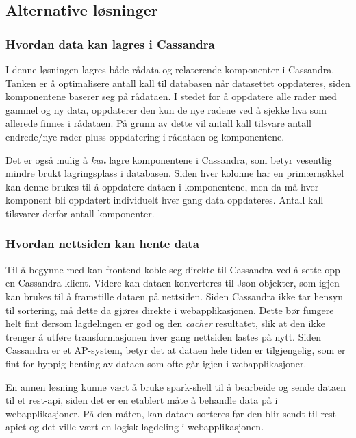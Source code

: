 \subsection{Alternative løsninger}

\subsubsection{Hvordan data kan lagres i Cassandra}
I denne løsningen lagres både rådata og relaterende komponenter i Cassandra. Tanken er å optimalisere antall kall til databasen når datasettet oppdateres, siden komponentene baserer seg på rådataen. I stedet for å oppdatere alle rader med gammel og ny data, oppdaterer den kun de nye radene ved å sjekke hva som allerede finnes i rådataen. På grunn av dette vil antall kall tilsvare antall endrede/nye rader pluss oppdatering i rådataen og komponentene.

Det er også mulig å \textit{kun} lagre komponentene i Cassandra, som betyr vesentlig mindre brukt lagringsplass i databasen. Siden hver kolonne har en primærnøkkel kan denne brukes til å oppdatere dataen i komponentene, men da må hver komponent bli oppdatert individuelt hver gang data oppdateres. Antall kall tilsvarer derfor antall komponenter.

\subsubsection{Hvordan nettsiden kan hente data}
Til å begynne med kan frontend koble seg direkte til Cassandra ved å sette opp en Cassandra-klient. Videre kan dataen konverteres til Json objekter, som igjen kan brukes til å framstille dataen på nettsiden. Siden Cassandra ikke tar hensyn til sortering, må dette da gjøres direkte i webapplikasjonen. Dette bør fungere helt fint dersom lagdelingen er god og den \textit{cacher} resultatet, slik at den ikke trenger å utføre transformasjonen hver gang nettsiden lastes på nytt. Siden Cassandra er et AP-system, betyr det at dataen hele tiden er tilgjengelig, som er fint for hyppig henting av dataen som ofte går igjen i webapplikasjoner.

En annen løsning kunne vært å bruke spark-shell til å bearbeide og sende dataen til et rest-api, siden det er en etablert måte å behandle data på i webapplikasjoner. På den måten, kan dataen sorteres før den blir sendt til rest-apiet og det ville vært en logisk lagdeling i webapplikasjonen.
